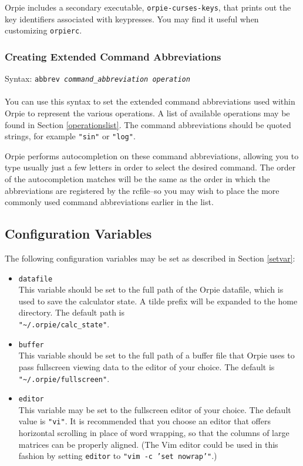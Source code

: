 \documentclass[11pt,notitlepage]{article}
\begin{document}
Orpie includes a secondary executable, {\tt orpie-curses-keys}, that prints out
the key identifiers associated with keypresses.  You may find it useful when customizing
{\tt orpierc}.

\subsubsection{Creating Extended Command Abbreviations}
\label{abbreviations}
Syntax: {\tt abbrev {\em command\_abbreviation operation}} \\ \\
You can use this syntax to set the extended command abbreviations used within
Orpie to represent the various operations.  A list of available operations may be found
in Section \ref{operationslist}.  The command abbreviations should be quoted strings,
for example {\tt "sin"} or {\tt "log"}.

Orpie performs autocompletion on these command abbreviations, allowing you to type
usually just a few letters in order to select the desired command.  The order of the
autocompletion matches will be the same as the order in which the abbreviations are
registered by the rcfile--so you may wish to place the more commonly used command
abbreviations earlier in the list.

\subsection{Configuration Variables}
\label{variables}
The following configuration variables may be set as described in Section \ref{setvar}:
\begin{itemize}
   \item {\tt datafile} \\
      This variable should be set to the full path of the Orpie datafile, which is used
      to save the calculator state.  A tilde prefix will be expanded to the home
      directory.  The default path is \\
      {\tt "\~{}/.orpie/calc\_state"}.
   \item {\tt buffer} \\
      This variable should be set to the full path of a buffer file that Orpie uses
      to pass fullscreen viewing data to the editor of your choice.  The default
      is {\tt "\~{}/.orpie/fullscreen"}.
   \item {\tt editor} \\
      This variable may be set to the fullscreen editor of your choice.  The default
      value is {\tt "vi"}.  It is recommended that you choose an editor that offers
      horizontal scrolling in place of word wrapping, so that the columns of large 
      matrices can be properly aligned.  (The Vim editor could be used in this fashion
      by setting {\tt editor} to {\tt "vim -c 'set nowrap'"}.)
\end{itemize}
\end{document}

